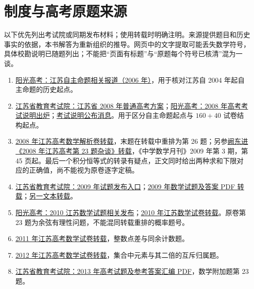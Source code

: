 \documentclass[UTF8]{ctexart}
\begin{document}
\section{制度与高考原题来源}\label{sec:sources}
以下优先列出考试院或同期发布材料；使用转载时明确注明。来源提供题目和历史事实的依据，本书解答为重新组织的推导。网页中的文字提取可能丢失数学符号，具体校勘说明已随题列出；不能把“页面有标题”与“原题每个符号已核清”混为一谈。
\begin{enumerate}
\item\label{src:history} \href{https://gaokao.chsi.com.cn/gkxx/ss/200604/20060405/432170.html}{阳光高考：江苏自主命题相关报道（2006 年）}，用于核对江苏自 2004 年起自主命题的历史起点。
\item\label{src:scheme} \href{https://www.jseea.cn/webfile/highschool_ty_artxk_files/2007-05-24/3187.html}{江苏省教育考试院：江苏省 2008 年普通高考方案}；\href{https://gaokao.chsi.com.cn/gkxx/js/200711/20071121/1598706.html}{阳光高考：2008 年高考考试说明出炉}；\href{https://gaokao.chsi.com.cn/gkxx/js/200711/20071121/1598761.html}{考试说明公布消息}。用于区分自主命题起点与 $160+40$ 试卷结构起点。
\item\label{src:g2008} \href{https://www.yeyulingfeng.com/wendang/194472.html}{2008 年江苏高考数学解析卷转载}，末题在转载中重排为第 26 题；另参\href{https://doc.xuehai.net/b69540a89a069c31e3680dd29.html}{阙东进《2008 年江苏高考第 23 题杂谈》转载}，《中学数学月刊》2009 年第 3 期，第 45 页起。最后一个积分恒等式的转录有疑点，正文同时给出两种求和下限对应的正确值，尚不能视为原卷逐字定稿。
\item\label{src:g2009} \href{https://www.jseea.cn/webfile/gaokao/2009-06-09/6597.html}{江苏省教育考试院：2009 年试题发布入口}；\href{https://29805199.s21i.faiusr.com/61/3/ABUIABA9GAAgqP6QowYovoST9wI.pdf}{2009 年数学试题及答案 PDF 转载}；\href{https://www.yeyulingfeng.com/wendang/15424.html}{另一文本转载}。
\item\label{src:g2010} \href{https://gaokao.chsi.com.cn/gkxx/ss/201006/20100612/96768571.html}{阳光高考：2010 江苏数学试题相关发布}；\href{https://www.yeyulingfeng.com/wendang/16407.html}{2010 年江苏数学试卷转载}。原卷第 23 题为余弦有理性问题，不能混同转载重排的概率题号。
\item\label{src:g2011} \href{https://www.yeyulingfeng.com/wendang/202979.html}{2011 年江苏高考数学试卷转载}，整数点差与同余计数题。
\item\label{src:g2012} \href{https://www.yeyulingfeng.com/wendang/21104.html}{2012 年江苏高考数学试卷转载}，集合中元素与其二倍的互斥归属题。
\item\label{src:g2013} \href{https://www.jseea.cn/webfile/upload/old/contents/channel_6/2013/06/1306100857696.pdf}{江苏省教育考试院：2013 年高考试题及参考答案汇编 PDF}，数学附加题第 23 题。

\end{enumerate}
\end{document}
